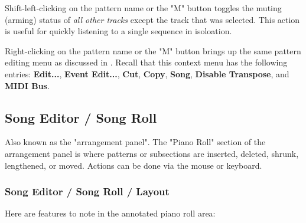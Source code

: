    Shift-left-clicking on the pattern name or the "M" button toggles the muting
   (arming) status of \textsl{all other tracks} except the track that was
   selected.  This action is useful for quickly listening to a single sequence
   in isoloation.

   Right-clicking on the pattern name or the "M" button brings up the same
   pattern editing menu as discussed in
   .
   Recall that this context menu has the following entries:
   \textbf{Edit...}, \textbf{Event Edit...}, \textbf{Cut}, \textbf{Copy},
   \textbf{Song}, \textbf{Disable Transpose}, and \textbf{MIDI Bus}.

\subsection{Song Editor / Song Roll}
\label{subsec:song_editor_song_roll}

   Also known as the "arrangement panel".
   The "Piano Roll" section of the arrangement panel is where patterns or
   subsections are inserted, deleted, shrunk, lengthened, or moved.
   Actions can be done via the mouse or keyboard.

\subsubsection{Song Editor / Song Roll / Layout}
\label{subsubsec:song_editor_song_roll_layout}

   Here are features to note in the annotated piano roll area:

